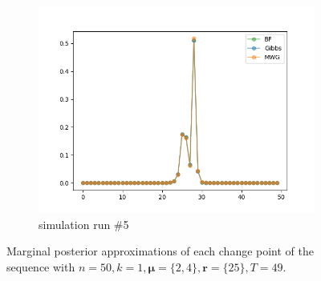 \begin{figure}[H]
\begin{subfigure}{.3\textwidth}
    	\includegraphics[width=\linewidth]{../../plots/Posterior_post_burnin_M2_N50_NMCMC1_seed4_diffind2.png}
    	\caption{simulation run \#5}
	\end{subfigure}
	\caption{Marginal posterior approximations of each change point of the sequence with $n=50, k=1, \bm{\mu}=\{2,4\}, \bm{r}=\{25\}, T=49$.}
\end{figure}

